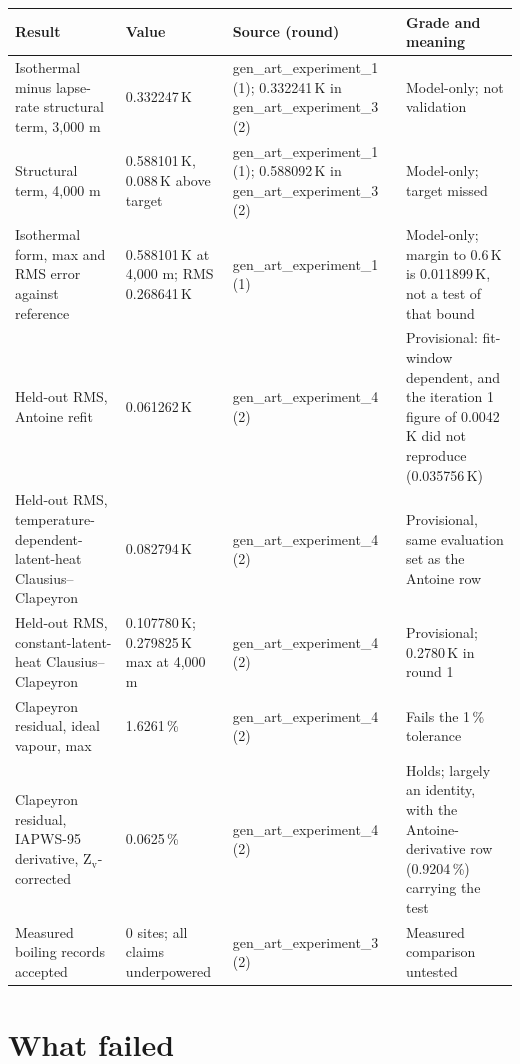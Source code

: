 \documentclass[11pt,letterpaper]{article}
\begin{document}
\begin{longtable}{p{4.4cm}p{3.6cm}p{2.7cm}p{4.6cm}}
\toprule
Result & Value & Source (round) & Grade and meaning \\
\midrule
\endhead
Isothermal minus lapse-rate structural term, 3,000 m & 0.332247\,K & gen\_art\_\allowbreak{}experiment\_1 (1); 0.332241\,K in gen\_art\_\allowbreak{}experiment\_3 (2) & Model-only; not validation \\
Structural term, 4,000 m & 0.588101\,K, 0.088\,K above target & gen\_art\_\allowbreak{}experiment\_1 (1); 0.588092\,K in gen\_art\_\allowbreak{}experiment\_3 (2) & Model-only; target missed \\
Isothermal form, max and RMS error against reference & 0.588101\,K at 4,000 m; RMS 0.268641\,K & gen\_art\_\allowbreak{}experiment\_1 (1) & Model-only; margin to 0.6\,K is 0.011899\,K, not a test of that bound \\
Held-out RMS, Antoine refit & 0.061262\,K & gen\_art\_\allowbreak{}experiment\_4 (2) & Provisional: fit-window dependent, and the iteration 1 figure of 0.0042\,K did not reproduce (0.035756\,K) \\
Held-out RMS, temperature-dependent-latent-heat Clausius--Clapeyron & 0.082794\,K & gen\_art\_\allowbreak{}experiment\_4 (2) & Provisional, same evaluation set as the Antoine row \\
Held-out RMS, constant-latent-heat Clausius--Clapeyron & 0.107780\,K; 0.279825\,K max at 4,000 m & gen\_art\_\allowbreak{}experiment\_4 (2) & Provisional; 0.2780\,K in round 1 \\
Clapeyron residual, ideal vapour, max & 1.6261\,\% & gen\_art\_\allowbreak{}experiment\_4 (2) & Fails the 1\,\% tolerance \\
Clapeyron residual, IAPWS-95 derivative, Z$_\mathrm{v}$-corrected & 0.0625\,\% & gen\_art\_\allowbreak{}experiment\_4 (2) & Holds; largely an identity, with the Antoine-derivative row (0.9204\,\%) carrying the test \\
Measured boiling records accepted & 0 sites; all claims underpowered & gen\_art\_\allowbreak{}experiment\_3 (2) & Measured comparison untested \\
\bottomrule
\end{longtable}

\section{What failed}
\end{document}
